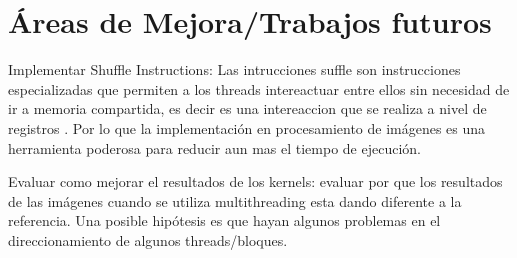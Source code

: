 \documentclass[conference]{IEEEtran}
\begin{document}
\section{\textbf{Áreas de Mejora/Trabajos futuros}}
\begin{list}{•}{}
\item
Implementar Shuffle Instructions: Las intrucciones suffle son instrucciones especializadas que permiten a los threads intereactuar entre ellos sin necesidad de ir a memoria compartida, es decir es una intereaccion que se realiza a nivel de registros \cite{warp_cuda}\cite{warp2}. Por lo que la implementación en procesamiento de imágenes es una herramienta poderosa para reducir aun mas el tiempo de ejecución.
\item
Evaluar como mejorar el resultados de los kernels: evaluar por que los resultados de las imágenes cuando se utiliza multithreading esta dando diferente a la referencia. Una posible hipótesis es que hayan algunos problemas en el direccionamiento de algunos threads/bloques. 
\end{list}





%


\end{document}
